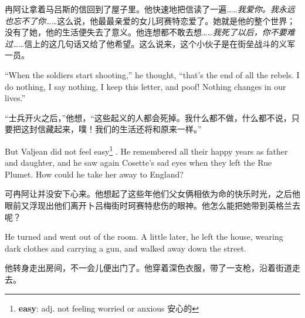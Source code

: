 \documentclass[fontset=ubuntu, zihao=5]{ctexart}
\begin{document}
\begin{paracol}{2}
\switchcolumn

冉阿让拿着马吕斯的信回到了屋子里。他快速地把信读了一遍……\emph{我爱你。我永远也忘不了你……}这么说，他最最亲爱的女儿珂赛特恋爱了。她就是他的整个世界；没有了她，他的生活便失去了意义。他连想都不敢去想……\emph{我死了以后，你不要难过……}信上的这几句话又给了他希望。这么说来，这个小伙子是在街垒战斗的义军一员。

\switchcolumn*

``When the soldiers start shooting,'' he thought, ``that's the end of all the rebels. I do nothing, I say nothing, I keep this letter, and poof! Nothing changes in our lives.''

\switchcolumn

“士兵开火之后，”他想，“这些起义的人都会死掉。我什么都不做，什么都不说，只要把这封信藏起来，噗！我们的生活还将和原来一样。”

\switchcolumn*

But Valjean did not feel easy\footnote{\textbf{easy}: adj. not feeling
  worried or anxious 安心的} . He remembered all their happy years as father
and daughter, and he saw again Cosette's sad eyes when they left the Rue
Plumet. How could he take her away to England?


\switchcolumn

可冉阿让并没安下心来。他想起了这些年他们父女俩相依为命的快乐时光，之后他眼前又浮现出他们离开卜吕梅街时珂赛特悲伤的眼神。他怎么能把她带到英格兰去呢？

\switchcolumn*

He turned and went out of the room. A little later, he left the house, wearing dark clothes and carrying a gun, and walked away down the street.

\switchcolumn

他转身走出房间，不一会儿便出门了。他穿着深色衣服，带了一支枪，沿着街道走去。

\end{paracol}
\clearpage
\end{document}
